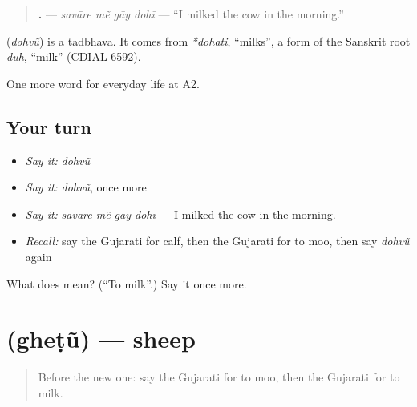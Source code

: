 \begin{quote}
\textbf{   .} — \emph{savāre mẽ gāy dohī} — \textquotedblleft{}I milked the cow in the morning.\textquotedblright{}
\end{quote}

\begin{cousinweb}
\textbf{} (\emph{dohvũ}) is a tadbhava. It comes from \emph{*dohati}, \textquotedblleft{}milks\textquotedblright{}, a form of the Sanskrit root \emph{duh}, \textquotedblleft{}milk\textquotedblright{} (CDIAL 6592).
\end{cousinweb}

\begin{grammarlens}[title={What you've built}]
One more word for everyday life at A2.
\end{grammarlens}

\subsection*{Your turn}
\begin{itemize}
\raggedright
  \item \emph{Say it:} \emph{dohvũ}
  \item \emph{Say it:} \emph{dohvũ}, once more
  \item \emph{Say it:} \emph{savāre mẽ gāy dohī} — I milked the cow in the morning.
  \item \emph{Recall:} say the Gujarati for calf, then the Gujarati for to moo, then say \emph{dohvũ} again
\end{itemize}

\begin{tcolorbox}[breakable,colback=teal!4,colframe=teal!35!black,title={Before you move on}]
What does  mean? (\textquotedblleft{}To milk\textquotedblright{}.) Say it once more.
\end{tcolorbox}
\section[\texorpdfstring{\gu{ઘેટું} (gheṭũ)}{ઘેટું (gheṭũ)}]{ (gheṭũ) — sheep}

\label{lesson:GU-C234-ghetu}



\begin{quote}
Before the new one: say the Gujarati for to moo, then the Gujarati for to milk.
\end{quote}

